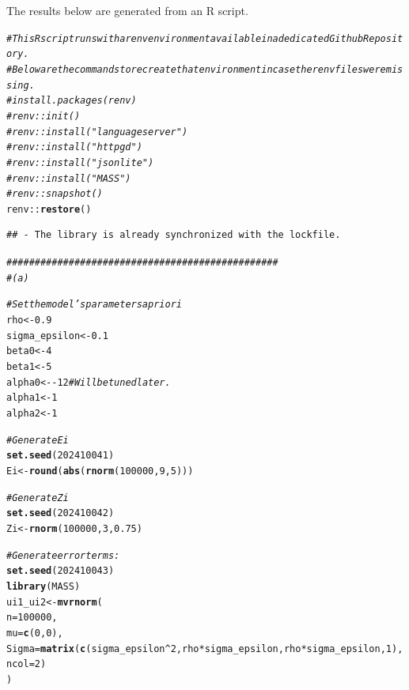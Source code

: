 \documentclass{article}\usepackage[]{graphicx}\usepackage[]{xcolor}
\makeatletter
\newcommand{\hlnum}[1]{\textcolor[rgb]{0.686,0.059,0.569}{#1}}%
\newcommand{\hlcom}[1]{\textcolor[rgb]{0.678,0.584,0.686}{\textit{#1}}}%
\newcommand{\hlopt}[1]{\textcolor[rgb]{0,0,0}{#1}}%
\newcommand{\hldef}[1]{\textcolor[rgb]{0.345,0.345,0.345}{#1}}%
\newcommand{\hlkwb}[1]{\textcolor[rgb]{0.69,0.353,0.396}{#1}}%
\newcommand{\hlkwc}[1]{\textcolor[rgb]{0.333,0.667,0.333}{#1}}%
\newcommand{\hlkwd}[1]{\textcolor[rgb]{0.737,0.353,0.396}{\textbf{#1}}}%
\newenvironment{kframe}{%
 \def\at@end@of@kframe{}%
 \ifinner\ifhmode%
  \def\at@end@of@kframe{\end{minipage}}%
  \begin{minipage}{\columnwidth}%
 \fi\fi%
 \def\FrameCommand##1{\hskip\@totalleftmargin \hskip-\fboxsep
 \colorbox{shadecolor}{##1}\hskip-\fboxsep
     \hskip-\linewidth \hskip-\@totalleftmargin \hskip\columnwidth}%
 \MakeFramed {\advance\hsize-\width
   \@totalleftmargin\z@ \linewidth\hsize
   \@setminipage}}%
 {\par\unskip\endMakeFramed%
 \at@end@of@kframe}
\newenvironment{knitrout}{}{} %
\makeatother
\begin{document}
The results below are generated from an R script.

\begin{knitrout}
\color{fgcolor}\begin{kframe}
\begin{alltt}
\hlcom{# This R script runs with a renv environment available in a dedicated Github Repository.}
\hlcom{# Below are the commands to recreate that environment in case the renv files were missing.}
\hlcom{#install.packages(renv)}
\hlcom{#renv::init()}
\hlcom{#renv::install("languageserver")}
\hlcom{#renv::install("httpgd")}
\hlcom{#renv::install("jsonlite")}
\hlcom{#renv::install("MASS")}
\hlcom{#renv::snapshot()}
\hldef{renv}\hlopt{::}\hlkwd{restore}\hldef{()}
\end{alltt}
\begin{verbatim}
## - The library is already synchronized with the lockfile.
\end{verbatim}
\begin{alltt}
\hlcom{################################################}
\hlcom{# (a)}

\hlcom{# Set the model's parameters a priori}
\hldef{rho}           \hlkwb{<-} \hlnum{0.9}
\hldef{sigma_epsilon} \hlkwb{<-} \hlnum{0.1}
\hldef{beta0}         \hlkwb{<-} \hlnum{4}
\hldef{beta1}         \hlkwb{<-} \hlnum{5}
\hldef{alpha0}        \hlkwb{<-} \hlopt{-}\hlnum{12} \hlcom{# Will be tuned later.}
\hldef{alpha1}        \hlkwb{<-} \hlnum{1}
\hldef{alpha2}        \hlkwb{<-} \hlnum{1}

\hlcom{# Generate Ei}
\hlkwd{set.seed}\hldef{(}\hlnum{202410041}\hldef{)}
\hldef{Ei} \hlkwb{<-} \hlkwd{round}\hldef{(}\hlkwd{abs}\hldef{(}\hlkwd{rnorm}\hldef{(}\hlnum{100000}\hldef{,} \hlnum{9}\hldef{,} \hlnum{5}\hldef{)))}

\hlcom{# Generate Zi}
\hlkwd{set.seed}\hldef{(}\hlnum{202410042}\hldef{)}
\hldef{Zi} \hlkwb{<-} \hlkwd{rnorm}\hldef{(}\hlnum{100000}\hldef{,} \hlnum{3}\hldef{,} \hlnum{0.75}\hldef{)}

\hlcom{# Generate error terms:}
\hlkwd{set.seed}\hldef{(}\hlnum{202410043}\hldef{)}
\hlkwd{library}\hldef{(MASS)}
\hldef{ui1_ui2} \hlkwb{<-} \hlkwd{mvrnorm}\hldef{(}
           \hlkwc{n} \hldef{=} \hlnum{100000}\hldef{,}
           \hlkwc{mu} \hldef{=} \hlkwd{c}\hldef{(}\hlnum{0}\hldef{,} \hlnum{0}\hldef{),}
           \hlkwc{Sigma} \hldef{=} \hlkwd{matrix}\hldef{(}\hlkwd{c}\hldef{(sigma_epsilon}\hlopt{^}\hlnum{2}\hldef{, rho}\hlopt{*}\hldef{sigma_epsilon, rho}\hlopt{*}\hldef{sigma_epsilon,} \hlnum{1}\hldef{),}
                          \hlkwc{ncol} \hldef{=} \hlnum{2}\hldef{)}
                  \hldef{)}


\end{alltt}
\end{kframe}
\end{knitrout}
\end{document}
